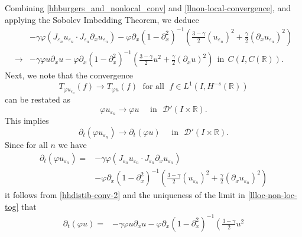 \documentclass[12pt,reqno]{amsart}
\newcommand{\rr}{\mathbb{R}}
\newcommand{\p}{\partial}
\newcommand{\ee}{\varepsilon}
\newcommand{\vp}{\varphi}
\theoremstyle{plain}  %
\theoremstyle{definition}
\begin{document}
\begin{appendices}
\begin{equation}
		\end{equation}
		Combining \eqref{hhburgers_and_nonlocal_conv} and
		\eqref{llnon-local-convergence}, and applying the Sobolev Imbedding
		Theorem, we deduce 
		\begin{equation}
			\begin{split}
				& -\gamma \vp (J_{\ee_n} u_{\ee_n} \cdot J_{\ee_n} \p_x
				u_{\ee_n}) -
				\vp \p_x(1- \p_x^2)^{-1} \left( \frac{3-\gamma}{2}
				(u_{\ee_n})^2
				 + \frac{\gamma}{2} (\p_x u_{\ee_n})^2 \right )
				 \\
				 \to & -\gamma \vp u \p_x u -
				 \vp \p_x(1- \p_x^2)^{-1} \left( \frac{3-\gamma}{2} u^2
				 + \frac{\gamma}{2} (\p_x u)^2 \right ) \ \
				 \text{in} \ \ C(I, C(\rr)).
				\label{llloc-non-loc-tog}
			\end{split}
		\end{equation}
		Next, we note that the convergence  
		\begin{equation}
			\label{hhweak-conv-2}
			T_{\vp u_{\ee_n}}(f)  \longrightarrow  T_{\vp u} (f) \;
			\text{ for all } \;  f \in L^1(I, H^{-s}(\rr))
		\end{equation}
		can be restated as 
		\begin{equation}
			\vp u_{\ee_n}  \longrightarrow  \vp u
			\quad
			\text{ in }  \,\,
			\mathcal{D}'(I\times \rr).
		\end{equation}
		This implies 
		\begin{equation}
			\label{hhdistib-conv-2}
			\p_t(\vp u_{\ee_n})  \longrightarrow  \p_t (\vp u)
			\quad
			\text{ in }  \,\, \mathcal{D}'(I\times \rr).
		\end{equation}
		Since for all $n$ we have 
		\begin{equation}
			\begin{split}
			 \p_t (\vp u_{\ee_n})
			 = & -\gamma \vp
			(J_{\varepsilon_n} u_{\varepsilon_n}  \cdot
			J_{\varepsilon_n}\partial_x u_{\varepsilon_n})
			\\
			& -
			\vp \p_x(1- \p_x^2)^{-1} \left( \frac{3-\gamma}{2} (u_{\ee_n})^2
			 + \frac{\gamma}{2} (\p_x u_{\ee_n})^2 \right )
		 \end{split}
		\end{equation}
		it follows from \eqref{hhdistib-conv-2} and the uniqueness of the
		limit in \eqref{llloc-non-loc-tog} that
		\begin{equation}
			\begin{split}
			 \p_t (\vp u)
			 = & -\gamma \vp
			u \p_x u - \vp \p_x(1- \p_x^2)^{-1} \left( \frac{3-\gamma}{2} u^2

\end{split}
\end{equation}
\end{appendices}
\end{document}
